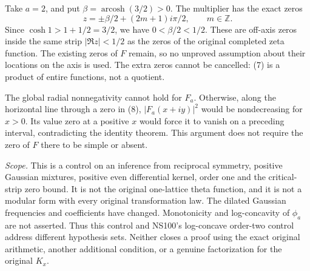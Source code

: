 Take $a=2$, and put $\beta=\operatorname{arcosh}(3/2)>0$. The multiplier
has the exact zeros
\[
 z=\pm\beta/2+(2m+1)i\pi/2,\qquad m\in\mathbb Z.        \tag{8}
\]
Since $\cosh 1>1+1/2=3/2$, we have $0<\beta/2<1/2$.
These are off-axis zeros inside the same strip $|\Re z|<1/2$ as the
zeros of the original completed zeta function. The existing zeros of $F$
remain, so no unproved assumption about their locations on the axis is
used. The extra zeros cannot be cancelled: (7) is a product of entire
functions, not a quotient.

The global radial nonnegativity cannot hold for $F_a$. Otherwise, along
the horizontal line through a zero in (8), $|F_a(x+iy)|^2$ would be
nondecreasing for $x>0$. Its value zero at a positive $x$ would force it
to vanish on a preceding interval, contradicting the identity theorem.
This argument does not require the zero of $F$ there to be simple or absent.

\emph{Scope.} This is a control on an inference from reciprocal symmetry,
positive Gaussian mixtures, positive even differential kernel, order one
and the critical-strip zero bound. It is not the original one-lattice
theta function, and it is not a modular form with every original
transformation law. The dilated Gaussian frequencies and coefficients
have changed. Monotonicity and log-concavity of $\phi_a$ are not asserted.
Thus this control and NS100's log-concave order-two control address
different hypothesis sets. Neither closes a proof using the exact original
arithmetic, another additional condition, or a genuine factorization for
the original $K_x$.

